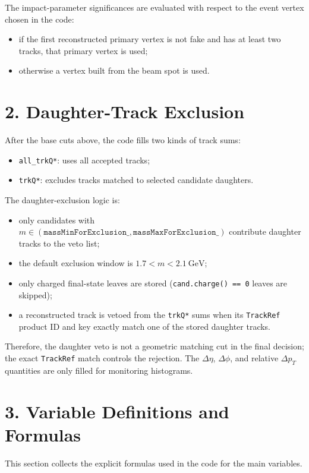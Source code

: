\documentclass[11pt]{article}
\begin{document}
The impact-parameter significances are evaluated with respect to the event vertex
chosen in the code:
\begin{itemize}
\item if the first reconstructed primary vertex is not fake and has at least two tracks,
  that primary vertex is used;
\item otherwise a vertex built from the beam spot is used.
\end{itemize}

\section*{2. Daughter-Track Exclusion}

After the base cuts above, the code fills two kinds of track sums:
\begin{itemize}
\item \texttt{all\_trkQ*}: uses all accepted tracks;
\item \texttt{trkQ*}: excludes tracks matched to selected candidate daughters.
\end{itemize}

The daughter-exclusion logic is:
\begin{itemize}
\item only candidates with
  $m \in (\texttt{massMinForExclusion\_}, \texttt{massMaxForExclusion\_})$
  contribute daughter tracks to the veto list;
\item the default exclusion window is
  $1.7 < m < 2.1~\mathrm{GeV}$;
\item only charged final-state leaves are stored
  (\texttt{cand.charge() == 0} leaves are skipped);
\item a reconstructed track is vetoed from the \texttt{trkQ*} sums when its
  \texttt{TrackRef} product ID and key exactly match one of the stored daughter tracks.
\end{itemize}

Therefore, the daughter veto is not a geometric matching cut in the final decision;
the exact \texttt{TrackRef} match controls the rejection. The $\Delta\eta$, $\Delta\phi$,
and relative $\Delta p_{T}$ quantities are only filled for monitoring histograms.

\section*{3. Variable Definitions and Formulas}

This section collects the explicit formulas used in the code for the main variables.
\end{document}
